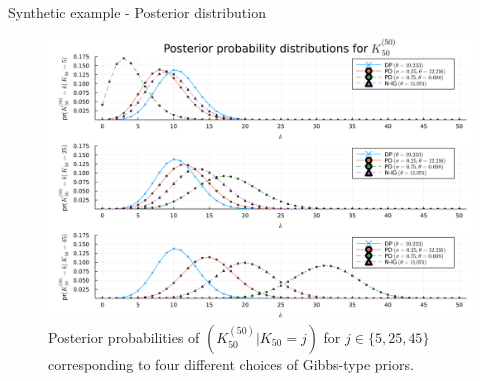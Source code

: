 \documentclass[11pt]{beamer}
\begin{document}
\begin{frame}{Synthetic example - Posterior distribution} 
    \begin{figure}
        \includegraphics[scale=0.1]{./img/posterior_probability.png}
        \caption{Posterior probabilities of \((K^{(50)}_{50} | K_{50} = j)\) for \(j \in \{5, 25, 45\}\) corresponding to four different choices of Gibbs-type priors.}
        \label{fig:posterior}
    \end{figure}
\end{frame}
\end{document}
